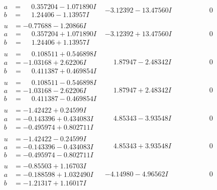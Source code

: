 \documentclass[1p]{elsarticle_modified}
\theoremstyle{definition}
\begin{document}
$$\begin{array}{c|c|c}
\begin{aligned}
a &= \phantom{-}0.357204 - 1.071890 I \\
b &= \phantom{-}1.24406 - 1.13957 I\end{aligned}
 & -3.12392 - 13.47560 I & \phantom{-0.000000 } 0 \\ \hline\begin{aligned}
u &= -0.77688 - 1.20866 I \\
a &= \phantom{-}0.357204 + 1.071890 I \\
b &= \phantom{-}1.24406 + 1.13957 I\end{aligned}
 & -3.12392 + 13.47560 I & \phantom{-0.000000 } 0 \\ \hline\begin{aligned}
u &= \phantom{-}0.108511 + 0.546898 I \\
a &= -1.03168 + 2.62206 I \\
b &= \phantom{-}0.411387 + 0.469854 I\end{aligned}
 & \phantom{-}1.87947 - 2.48342 I & \phantom{-0.000000 } 0 \\ \hline\begin{aligned}
u &= \phantom{-}0.108511 - 0.546898 I \\
a &= -1.03168 - 2.62206 I \\
b &= \phantom{-}0.411387 - 0.469854 I\end{aligned}
 & \phantom{-}1.87947 + 2.48342 I & \phantom{-0.000000 } 0 \\ \hline\begin{aligned}
u &= -1.42422 + 0.24599 I \\
a &= -0.143396 + 0.434083 I \\
b &= -0.495974 + 0.802711 I\end{aligned}
 & \phantom{-}4.85343 - 3.93548 I & \phantom{-0.000000 } 0 \\ \hline\begin{aligned}
u &= -1.42422 - 0.24599 I \\
a &= -0.143396 - 0.434083 I \\
b &= -0.495974 - 0.802711 I\end{aligned}
 & \phantom{-}4.85343 + 3.93548 I & \phantom{-0.000000 } 0 \\ \hline\begin{aligned}
u &= -0.85503 + 1.16703 I \\
a &= -0.188598 + 1.032490 I \\
b &= -1.21317 + 1.16017 I\end{aligned}
 & -4.14980 - 4.96562 I & \phantom{-0.000000 } 0 \\ \hline\begin{aligned}

\end{aligned}
\end{array}$$
\end{document}
